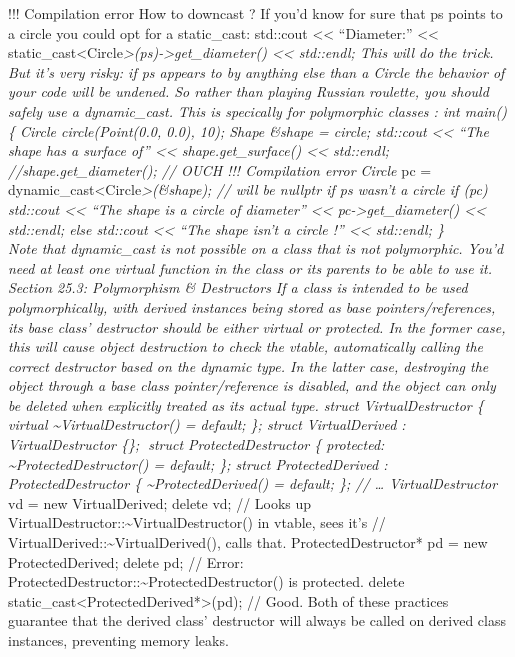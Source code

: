 !!! Compilation error How to downcast ? If you'd know for sure that ps
points to a circle you could opt for a static\_cast: std::cout
\textless\textless{} ``Diameter:'' \textless\textless{}
static\_cast\textless Circle\emph{\textgreater(ps)-\textgreater get\_diameter()
\textless\textless{} std::endl; This will do the trick. But it's very
risky: if ps appears to by anything else than a Circle the behavior of
your code will be undened. So rather than playing Russian roulette, you
should safely use a dynamic\_cast. This is specically for polymorphic
classes : int main() \{ Circle circle(Point(0.0, 0.0), 10); Shape
\&shape = circle; std::cout \textless\textless{} ``The shape has a
surface of'' \textless\textless{} shape.get\_surface()
\textless\textless{} std::endl; //shape.get\_diameter(); // OUCH !!!
Compilation error Circle }pc =
dynamic\_cast\textless Circle\emph{\textgreater(\&shape); // will be
nullptr if ps wasn't a circle if (pc) std::cout \textless\textless{}
``The shape is a circle of diameter'' \textless\textless{}
pc-\textgreater get\_diameter() \textless\textless{} std::endl; else
std::cout \textless\textless{} ``The shape isn't a circle !''
\textless\textless{} std::endl; \}\\
Note that dynamic\_cast is not possible on a class that is not
polymorphic. You'd need at least one virtual function in the class or
its parents to be able to use it. Section 25.3: Polymorphism \&
Destructors If a class is intended to be used polymorphically, with
derived instances being stored as base pointers/references, its base
class' destructor should be either virtual or protected. In the former
case, this will cause object destruction to check the vtable,
automatically calling the correct destructor based on the dynamic type.
In the latter case, destroying the object through a base class
pointer/reference is disabled, and the object can only be deleted when
explicitly treated as its actual type. struct VirtualDestructor \{
virtual \textasciitilde VirtualDestructor() = default; \}; struct
VirtualDerived : VirtualDestructor \{\}; struct ProtectedDestructor \{
protected: \textasciitilde ProtectedDestructor() = default; \}; struct
ProtectedDerived : ProtectedDestructor \{
\textasciitilde ProtectedDerived() = default; \}; // \ldots{}
VirtualDestructor} vd = new VirtualDerived; delete vd; // Looks up
VirtualDestructor::\textasciitilde VirtualDestructor() in vtable, sees
it's // VirtualDerived::\textasciitilde VirtualDerived(), calls that.
ProtectedDestructor* pd = new ProtectedDerived; delete pd; // Error:
ProtectedDestructor::\textasciitilde ProtectedDestructor() is protected.
delete static\_cast\textless ProtectedDerived*\textgreater(pd); // Good.
Both of these practices guarantee that the derived class' destructor
will always be called on derived class instances, preventing memory
leaks.

